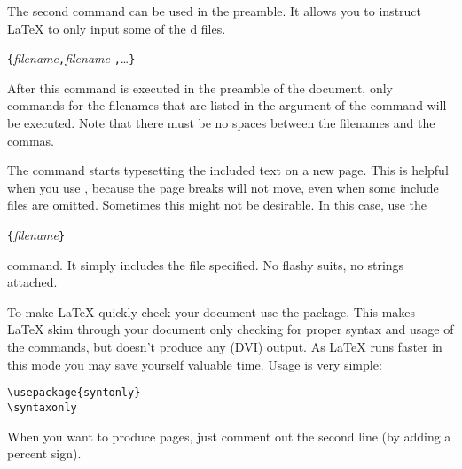 The second command can be used in the preamble. It allows you to
instruct \LaTeX{} to only input some of the \verb||d files.
\begin{lscommand}
\verb|{|\emph{filename}\verb|,|\emph{filename}%
\verb|,|\ldots\verb|}|
\end{lscommand}
After this command is executed in the preamble of the document, only
 commands for the filenames that are listed in the
argument of the  command will be executed. Note that
there must be no spaces between the filenames and the commas.

The  command starts typesetting the included text on a new
page. This is helpful when you use , because the
page breaks will not move, even when some include files are omitted.
Sometimes this might not be desirable. In this case, use the
\begin{lscommand}
\verb|{|\emph{filename}\verb|}|
\end{lscommand}
\noindent command. It simply includes the file specified. 
No flashy suits, no strings attached.


To make \LaTeX{} quickly check your document use the 
package. This makes \LaTeX{} skim through your document only checking for
proper syntax and usage of the commands, but doesn't produce any (DVI) output.
As \LaTeX{} runs faster in this mode you may save yourself valuable time.
Usage is very simple:

\begin{verbatim}
\usepackage{syntonly}
\syntaxonly
\end{verbatim}
When you want to produce pages, just comment out the second line
(by adding a percent sign).


%

